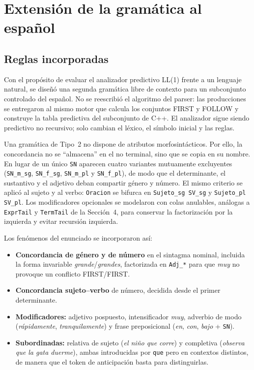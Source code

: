 \section{Extensión de la gramática al español}

\subsection{Reglas incorporadas}
Con el propósito de evaluar el analizador predictivo LL(1) frente a un lenguaje natural, se diseñó una segunda gramática libre de contexto para un subconjunto controlado del español. No se reescribió el algoritmo del parser: las producciones se entregaron al mismo motor que calcula los conjuntos FIRST y FOLLOW y construye la tabla predictiva del subconjunto de C++. El analizador sigue siendo predictivo no recursivo; solo cambian el léxico, el símbolo inicial y las reglas.

Una gramática de Tipo~2 no dispone de atributos morfosintácticos. Por ello, la concordancia no se ``almacena'' en el no terminal, sino que se copia en su nombre. En lugar de un único \texttt{SN} aparecen cuatro variantes mutuamente excluyentes (\texttt{SN\_m\_sg}, \texttt{SN\_f\_sg}, \texttt{SN\_m\_pl} y \texttt{SN\_f\_pl}), de modo que el determinante, el sustantivo y el adjetivo deban compartir género y número. El mismo criterio se aplicó al sujeto y al verbo: \texttt{Oracion} se bifurca en \texttt{Sujeto\_sg SV\_sg} y \texttt{Sujeto\_pl SV\_pl}. Los modificadores opcionales se modelaron con colas anulables, análogas a \texttt{ExprTail} y \texttt{TermTail} de la Sección~4, para conservar la factorización por la izquierda y evitar recursión izquierda.

Los fenómenos del enunciado se incorporaron así:
\begin{itemize}
    \item \textbf{Concordancia de género y de número} en el sintagma nominal, incluida la forma invariable \textit{grande}/\textit{grandes}, factorizada en \texttt{Adj\_*} para que \textit{muy} no provoque un conflicto FIRST/FIRST.
    \item \textbf{Concordancia sujeto--verbo} de número, decidida desde el primer determinante.
    \item \textbf{Modificadores:} adjetivo pospuesto, intensificador \textit{muy}, adverbio de modo (\textit{rápidamente}, \textit{tranquilamente}) y frase preposicional (\textit{en}, \textit{con}, \textit{bajo} + \texttt{SN}).
    \item \textbf{Subordinadas:} relativa de sujeto (\textit{el niño que corre}) y completiva (\textit{observa que la gata duerme}), ambas introducidas por \texttt{que} pero en contextos distintos, de manera que el token de anticipación basta para distinguirlas.
\end{itemize}

